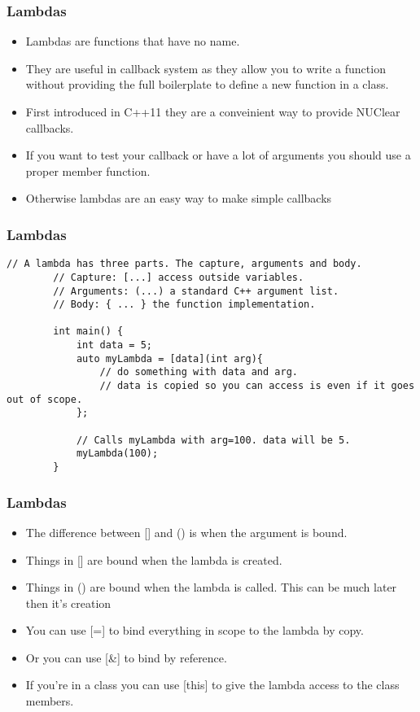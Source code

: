 \documentclass{beamer}
\begin{document}
\begin{frame}
	\frametitle{Lambdas}
	\begin{itemize}
		\item Lambdas are functions that have no name.
		\item They are useful in callback system as they allow you to write a function without providing the full boilerplate
			to define a new function in a class.
		\item First introduced in C++11 they are a conveinient way to provide NUClear callbacks.
		\item If you want to test your callback or have a lot of arguments you should use a proper member function.
		\item Otherwise lambdas are an easy way to make simple callbacks
	\end{itemize}
\end{frame}

\begin{frame}[fragile]
	\frametitle{Lambdas}
	\begin{lstlisting}[language=nuclear]
		// A lambda has three parts. The capture, arguments and body.
		// Capture: [...] access outside variables.
		// Arguments: (...) a standard C++ argument list.
		// Body: { ... } the function implementation.

		int main() {
		    int data = 5;
		    auto myLambda = [data](int arg){
		        // do something with data and arg.
		        // data is copied so you can access is even if it goes out of scope.
		    };

		    // Calls myLambda with arg=100. data will be 5.
		    myLambda(100);
		}
	\end{lstlisting}
\end{frame}

\begin{frame}
	\frametitle{Lambdas}
	\begin{itemize}
		\item The difference between [] and () is when the argument is bound.
		\item Things in [] are bound when the lambda is created.
		\item Things in () are bound when the lambda is called. This can be much later then it's creation
		\item You can use [=] to bind everything in scope to the lambda by copy.
		\item Or you can use [\&] to bind by reference.
		\item If you're in a class you can use [this] to give the lambda access to the class members.
	\end{itemize}
\end{frame}
\end{document}
